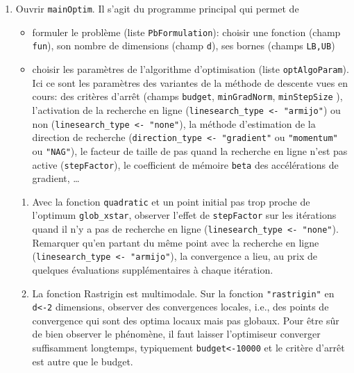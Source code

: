 \documentclass[12pt]{article}
\begin{document}
\begin{enumerate}
\item Ouvrir \texttt{mainOptim}. Il s'agit du programme principal qui permet de 
\begin{itemize}
\item formuler le problème (liste \texttt{PbFormulation}): choisir une fonction (champ \texttt{fun}), son nombre de dimensions (champ \texttt{d}), ses bornes (champs \texttt{LB,UB})
\item choisir les paramètres de l'algorithme d'optimisation (liste \texttt{optAlgoParam}).
Ici ce sont les paramètres des variantes de la méthode de descente vues en cours: des critères d'arrêt (champs \texttt{budget}, \texttt{minGradNorm}, \texttt{minStepSize} ), l'activation de la recherche en ligne (\texttt{linesearch\_type <- "armijo"}) ou non (\texttt{linesearch\_type <- "none"}), la méthode d'estimation de la direction de recherche (\texttt{direction\_type <- "gradient"} ou \texttt{"momentum"} ou \texttt{"NAG"}), le facteur de taille de pas quand la recherche en ligne n'est pas active (\texttt{stepFactor}), le coefficient de mémoire \texttt{beta} des accélérations de gradient, \ldots
\end{itemize}
\begin{enumerate}
\item Avec la fonction \texttt{quadratic} et un point initial pas trop proche de l'optimum \texttt{glob\_xstar}, observer l'effet de \texttt{stepFactor} sur les itérations quand il n'y a pas de recherche en ligne (\texttt{linesearch\_type <- "none"}). Remarquer qu'en partant du même point avec la recherche en ligne (\texttt{linesearch\_type <- "armijo"}), la convergence a lieu, au prix de quelques évaluations supplémentaires à chaque itération.
\item  La fonction Rastrigin est multimodale. Sur la fonction \texttt{"rastrigin"} en \texttt{d<-2} dimensions, observer des convergences locales, i.e., des points de convergence qui sont des optima locaux mais pas globaux. Pour être sûr de bien observer le phénomène, il faut laisser l'optimiseur converger suffisamment longtemps, typiquement \texttt{budget<-10000} et le critère d'arrêt est autre que le budget.
\end{enumerate}

\end{enumerate}
\end{document}

